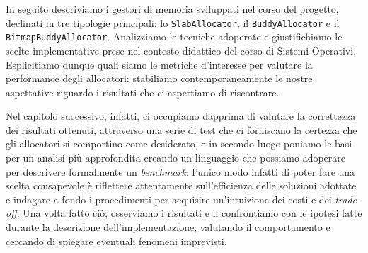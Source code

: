 In seguito descriviamo i gestori di memoria sviluppati nel corso del progetto, declinati in tre tipologie principali: lo \texttt{SlabAllocator}, il \texttt{BuddyAllocator} e il \texttt{BitmapBuddyAllocator}. Analizziamo le tecniche adoperate e giustifichiamo le scelte implementative prese nel contesto didattico del corso di Sistemi Operativi. Esplicitiamo dunque quali siamo le metriche d'interesse per valutare la performance degli allocatori: stabiliamo contemporaneamente le nostre aspettative riguardo i risultati che ci aspettiamo di riscontrare.

Nel capitolo successivo, infatti, ci occupiamo dapprima di valutare la correttezza dei risultati ottenuti, attraverso una serie di test che ci forniscano la certezza che gli allocatori si comportino come desiderato, e in secondo luogo poniamo le basi per un analisi più approfondita creando un linguaggio che possiamo adoperare per descrivere formalmente un \textit{benchmark}: l'unico modo infatti di poter fare una scelta consapevole è riflettere attentamente sull'efficienza delle soluzioni adottate e indagare a fondo i procedimenti per acquisire un'intuizione dei costi e dei \textit{trade-off}.
Una volta fatto ciò, osserviamo i risultati e li confrontiamo con le ipotesi fatte durante la descrizione dell'implementazione, valutando il comportamento e cercando di spiegare eventuali fenomeni imprevisti. 